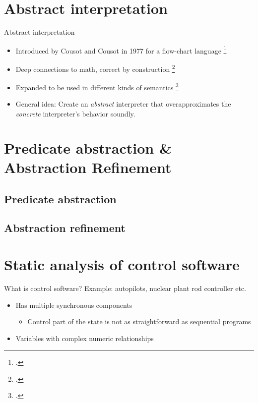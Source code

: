 \documentclass[aspectratio=169]{beamer}
\begin{document}
\section{Abstract interpretation}
\begin{frame}{Abstract interpretation}
  \begin{itemize}
  \item<1-> Introduced by Cousot and Cousot in 1977 for a flow-chart language \footcite{cousot1977abstract}
  \item<2-> Deep connections to math, correct by construction \footcite{cousot1979systematic}
  \item<3-> Expanded to be used in different kinds of semantics \footcite{schmidt1998trace,schmidt2009abstract}
  \item<4-> General idea: Create an \emph{abstract} interpreter that
    overapproximates the \emph{concrete} interpreter's behavior
    soundly.
  \end{itemize}
\end{frame}

\section{Predicate abstraction \& Abstraction Refinement}
\subsection{Predicate abstraction}
\subsection{Abstraction refinement}

\section{Static analysis of control software}
\begin{frame}{What is control software?}
  Example: autopilots, nuclear plant rod controller etc.
  
  \begin{itemize}
  \item<2-> Has multiple synchronous components
    \begin{itemize}
    \item<3-> Control part of the state is not as straightforward as sequential programs
    \end{itemize}
  \item<4-> Variables with complex numeric relationships
  \end{itemize}
\end{frame}
\end{document}
